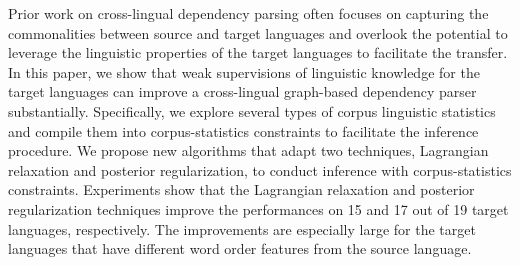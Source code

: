 Prior work on cross-lingual dependency parsing often focuses on capturing the commonalities
between source and target languages and overlook the potential to leverage the linguistic
properties of the target languages to facilitate the transfer. In this paper, we show that weak supervisions of linguistic knowledge for the target languages can improve a cross-lingual graph-based dependency parser substantially. Specifically, we explore several types of corpus linguistic statistics and compile them into corpus-statistics constraints to facilitate the inference procedure. We propose new algorithms that adapt two techniques, Lagrangian relaxation and posterior regularization, to conduct inference with corpus-statistics constraints. Experiments show that the Lagrangian relaxation and posterior regularization techniques improve the performances on 15 and 17 out of 19 target languages, respectively. The improvements are
especially large for the target languages that have different word order features from the
source language.